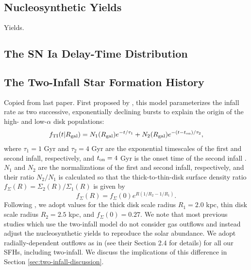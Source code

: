 \documentclass[twocolumn,twocolappendix,linenumbers]{aastex631}
\newcommand{\todo}[1]{{\color{red}#1}}
\begin{document}
\subsection{Nucleosynthetic Yields}
\label{sec:yields}

\begin{table}
    \centering
    \caption{Yields.}
    \label{tab:yields}
    
\end{table}

\subsection{The SN Ia Delay-Time Distribution}
\label{sec:dtd}

\subsection{The Two-Infall Star Formation History}
\label{sec:sfh}

\todo{Copied from last paper.} First proposed by \citet{chiappini_chemical_1997}, this model parameterizes the infall rate as two successive, exponentially declining bursts to explain the origin of the high- and low-$\alpha$ disk populations:
\begin{equation}
    \label{eq:twoinfall-ifr}
    f_{\rm TI}(t|R_{\rm gal}) = N_1(R_{\rm gal}) e^{-t/\tau_1} + N_2(R_{\rm gal}) e^{-(t-t_{\rm on})/\tau_2},
\end{equation}
where $\tau_1=1$ Gyr and $\tau_2=4$ Gyr are the exponential timescales of the first and second infall, respectively, and $t_{\rm on}=4$ Gyr is the onset time of the second infall \citep[based on typical values in, e.g.,][]{chiappini_chemical_1997,spitoni_galactic_2020,spitoni_apogee_2021}. $N_1$ and $N_2$ are the normalizations of the first and second infall, respectively, and their ratio $N_2/N_1$ is calculated so that the thick-to-thin-disk surface density ratio $f_\Sigma(R)=\Sigma_2(R)/\Sigma_1(R)$ is given by
\begin{equation}
    f_\Sigma(R) = f_\Sigma(0) e^{R(1/R_2 - 1/R_1)}.
\end{equation}
Following \citet{bland-hawthorn_galaxy_2016}, we adopt values for the thick disk scale radius $R_1=2.0$ kpc, thin disk scale radius $R_2=2.5$ kpc, and $f_\Sigma(0)=0.27$.
We note that most previous studies which use the two-infall model \citep[e.g.][]{chiappini_chemical_1997,matteucci_new_2006,matteucci_effect_2009,spitoni_galactic_2019} do not consider gas outflows and instead adjust the nucleosynthetic yields to reproduce the solar abundance. We adopt radially-dependent outflows as in  (see their Section 2.4 for details) for all our SFHs, including two-infall. We discuss the implications of this difference in Section \ref{sec:two-infall-discussion}.
\end{document}
